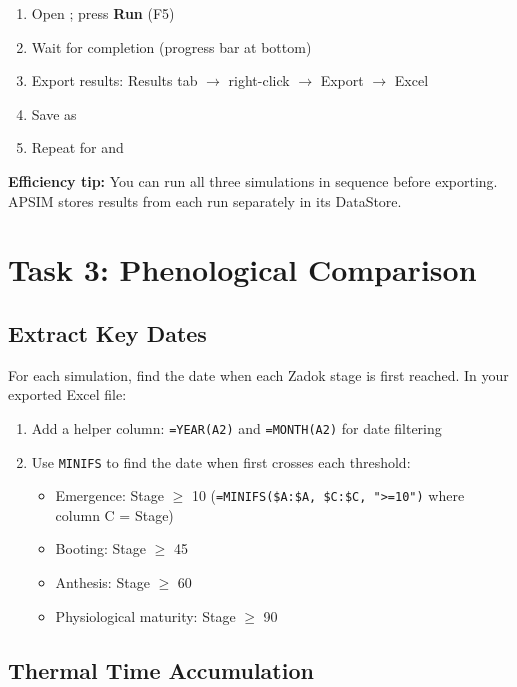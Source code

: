 \begin{enumerate}
  \item Open ; press \textbf{Run} (F5)
  \item Wait for completion (progress bar at bottom)
  \item Export results: Results tab $\to$ right-click $\to$ Export $\to$ Excel
  \item Save as 
  \item Repeat for  and 
\end{enumerate}

\begin{tipbox}
\textbf{Efficiency tip:} You can run all three simulations in sequence before exporting. APSIM stores results from each run separately in its DataStore.
\end{tipbox}

\section{Task 3: Phenological Comparison}

\subsection{Extract Key Dates}

For each simulation, find the date when each Zadok stage is first reached. In your exported Excel file:

\begin{enumerate}
  \item Add a helper column: \texttt{=YEAR(A2)} and \texttt{=MONTH(A2)} for date filtering
  \item Use \texttt{MINIFS} to find the date when  first crosses each threshold:
    \begin{itemize}
      \item Emergence: Stage $\geq$ 10 (\texttt{=MINIFS(\$A:\$A, \$C:\$C, ">=10")} where column C = Stage)
      \item Booting: Stage $\geq$ 45
      \item Anthesis: Stage $\geq$ 60
      \item Physiological maturity: Stage $\geq$ 90
    \end{itemize}
\end{enumerate}

\subsection{Thermal Time Accumulation}


